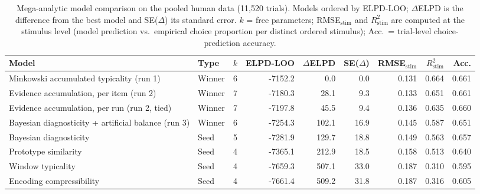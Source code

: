 \begin{table}[ht]
\centering
\caption{Mega-analytic model comparison on the pooled human data (11,520 trials). Models ordered by ELPD-LOO; $\Delta$ELPD is the difference from the best model and SE($\Delta$) its standard error. $k$ = free parameters; RMSE$_{\mathrm{stim}}$ and $R^2_{\mathrm{stim}}$ are computed at the stimulus level (model prediction vs.\ empirical choice proportion per distinct ordered stimulus); Acc.\ = trial-level choice-prediction accuracy.} 
\label{tab:mega-comparison}
\begin{tabular}{llrrrrrrr}
  \toprule
Model & Type & $k$ & ELPD-LOO & $\Delta$ELPD & SE($\Delta$) & RMSE$_{\mathrm{stim}}$ & $R^2_{\mathrm{stim}}$ & Acc. \\ 
  \midrule
Minkowski accumulated typicality (run 1) & Winner & 6 & -7152.2 & 0.0 & 0.0 & 0.131 & 0.664 & 0.661 \\ 
  Evidence accumulation, per item (run 2) & Winner & 7 & -7180.3 & 28.1 & 9.3 & 0.133 & 0.651 & 0.661 \\ 
  Evidence accumulation, per run (run 2, tied) & Winner & 7 & -7197.8 & 45.5 & 9.4 & 0.136 & 0.635 & 0.660 \\ 
  Bayesian diagnosticity + artificial balance (run 3) & Winner & 6 & -7254.3 & 102.1 & 16.9 & 0.145 & 0.587 & 0.651 \\ 
  Bayesian diagnosticity & Seed & 5 & -7281.9 & 129.7 & 18.8 & 0.149 & 0.563 & 0.657 \\ 
  Prototype similarity & Seed & 4 & -7365.1 & 212.9 & 18.5 & 0.158 & 0.513 & 0.640 \\ 
  Window typicality & Seed & 4 & -7659.3 & 507.1 & 33.0 & 0.187 & 0.310 & 0.595 \\ 
  Encoding compressibility & Seed & 4 & -7661.4 & 509.2 & 31.8 & 0.187 & 0.316 & 0.605 \\ 
   \bottomrule
\end{tabular}
\end{table}
